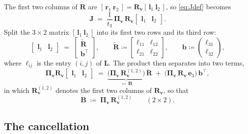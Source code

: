 \documentclass[11pt,a4paper]{article}
\theoremstyle{remark}
\newcommand{\Rmat}{\mathbf{R}}
\newcommand{\Rtil}{\widetilde{\mathbf{R}}}
\newcommand{\Bmat}{\mathbf{B}}
\newcommand{\Jmat}{\mathbf{J}}
\newcommand{\Lmat}{\mathbf{L}}
\newcommand{\Rvee}{\mathbf{R}_{\vvec}}
\newcommand{\Pimat}{\boldsymbol{\Pi}_{\vvec}}
\newcommand{\bvec}{\mathbf{b}}
\newcommand{\evec}{\mathbf{e}}
\newcommand{\lvec}{\mathbf{l}}
\newcommand{\rvec}{\mathbf{r}}
\newcommand{\vvec}{\mathbf{v}}
\begin{document}
The first two columns of $\Rmat$ are
$[\,\rvec_1\ \rvec_2\,] = \Rvee[\,\lvec_1\ \lvec_2\,]$, so \eqref{eq:Jdef}
becomes
\begin{equation}
  \Jmat \;=\; \frac{1}{t_3}\,\Pimat\,\Rvee
  \begin{bmatrix} \lvec_1 & \lvec_2 \end{bmatrix}.
  \label{eq:Jsub}
\end{equation}
Split the $3\times2$ matrix $[\,\lvec_1\ \lvec_2\,]$ into its first two rows and
its third row:
\begin{equation}
  \begin{bmatrix} \lvec_1 & \lvec_2 \end{bmatrix}
  \;=\;
  \begin{bmatrix} \Rtil \\[2pt] \bvec^{\top} \end{bmatrix},
  \qquad
  \Rtil \coloneqq
  \begin{bmatrix}
    \ell_{11} & \ell_{12} \\
    \ell_{21} & \ell_{22}
  \end{bmatrix},
  \qquad
  \bvec \coloneqq
  \begin{pmatrix} \ell_{31} \\ \ell_{32} \end{pmatrix},
  \label{eq:split}
\end{equation}
where $\ell_{ij}$ is the entry $(i,j)$ of $\Lmat$. The product then separates
into two terms,
\begin{equation}
  \Pimat\Rvee
  \begin{bmatrix} \lvec_1 & \lvec_2 \end{bmatrix}
  \;=\;
  \underbrace{\big(\Pimat\,\Rvee^{(1,2)}\big)}_{\textstyle \eqqcolon\, \Bmat}
  \,\Rtil
  \;+\;
  \big(\Pimat\,\Rvee\,\evec_3\big)\,\bvec^{\top},
  \label{eq:twoterms}
\end{equation}
in which $\Rvee^{(1,2)}$ denotes the first two columns of $\Rvee$, so that
\begin{equation}
  \Bmat \;\coloneqq\; \Pimat\,\Rvee^{(1,2)}
  \qquad (2\times2).
  \label{eq:Bdef}
\end{equation}

\subsection{The cancellation}
\end{document}
